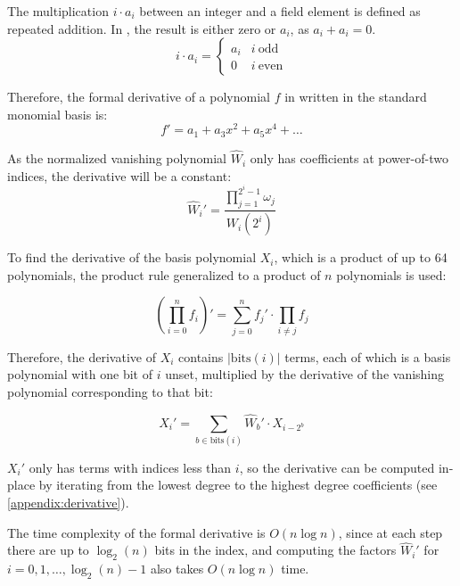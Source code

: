 The multiplication $i \cdot a_i$ between an integer and a field element is defined as repeated addition. In , the result is either zero or $a_i$, as $a_i + a_i = 0$.
\begin{equation}
i \cdot a_i =
    \begin{cases}
        a_i & i\ \text{odd} \\
        0 & i\ \text{even}
    \end{cases}
\end{equation}

Therefore, the formal derivative of a polynomial $f$ in  written in the standard monomial basis is:
\begin{equation}f' = a_1 + a_3 x^2 + a_5 x^4 + \ldots\end{equation}

As the normalized vanishing polynomial $\hat{W}_i$ only has coefficients at power-of-two indices, the derivative will be a constant:
\begin{equation}\hat{W}_i' = \frac{\prod_{j = 1}^{2^i - 1} \omega_j}{W_i(2^i)}\end{equation}

To find the derivative of the basis polynomial $X_i$, which is a product of up to 64 polynomials, the product rule generalized to a product of $n$ polynomials is used:

\begin{equation}
(\prod_{i = 0}^{n} f_i)' = \sum_{j = 0}^{n} f_j' \cdot \prod_{i \neq j} f_j
\end{equation}

Therefore, the derivative of $X_i$ contains $|\text{bits}(i)|$ terms, each of which is a basis polynomial with one bit of $i$ unset, multiplied by the derivative of the vanishing polynomial corresponding to that bit:

\begin{equation}
X_i' = \sum_{b \in \text{bits}(i)} \hat{W}_b' \cdot X_{i - 2^b}
\end{equation}

$X_i'$ only has terms with indices less than $i$, so the derivative can be computed in-place by iterating from the lowest degree to the highest degree coefficients (see \ref{appendix:derivative}).

The time complexity of the formal derivative is $O(n \log n)$, since at each step there are up to $\log_2(n)$ bits in the index, and computing the factors $\hat{W}_i'$ for $i = 0, 1, \ldots, \log_2(n) - 1$ also takes $O(n \log n)$ time.

